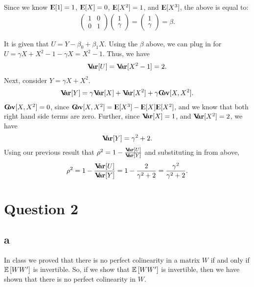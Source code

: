 \documentclass[12pt]{paper}
\newcommand{\E}{{\rm I\kern-.3em E}}
\newcommand{\Var}{{\rm \textbf{V\kern-.3em ar}}}
\newcommand{\Cov}{{\rm \textbf{C\kern-.3em ov}}}
\begin{document}
Since we know $\E[1]=1$, $\E[X]=0$, $\E[X^2]=1$, and $\E[X^3]$, the above is equal to:
\begin{align*}
\begin{pmatrix}
1 & 0\\
0 & 1
\end{pmatrix}
\begin{pmatrix}
1\\
\gamma
\end{pmatrix}
=
\begin{pmatrix}
1\\
\gamma
\end{pmatrix}=\beta.
\end{align*}

It is given that $U=Y-\beta_0+\beta_1X$. Using the $\beta$ above, we can plug in for $U=\gamma X+X^2-1-\gamma X= X^2-1$. Thus, we have
\begin{align*}
\Var[U]=\Var[X^2-1]=2.
\end{align*}
Next, consider $Y=\gamma X+X^2$.
\begin{align*}
\Var[Y]=\gamma \Var[X]+\Var[X^2]+\gamma \Cov[X,X^2].
\end{align*}
$\Cov[X,X^2]=0$, since $\Cov[X,X^2]=\E[X^3]-\E[X]\E[X^2]$, and we know that both right hand side terms are zero. Further, since $\Var[X]=1$, and $\Var[X^2]=2$, we have
\begin{align*}
\Var[Y]=\gamma^2+2.
\end{align*}
Using our previous result that $\rho^2=1-\frac{\Var[U]}{\Var[Y]}$ and substituting in from above,
\begin{align*}
\rho^2=1-\frac{\Var[U]}{\Var[Y]}=1-\frac{2}{\gamma^2+2}=\frac{\gamma^2}{\gamma^2 +2}.
\end{align*}



\section*{Question 2}

\subsection*{a}

In class we proved that there is no perfect colinearity in a matrix $W$ if and only if $\mathbb{E} \left [ WW' \right ]$ is invertible. So, if we show that $\mathbb{E} \left [ WW' \right ]$ is invertible, then we have shown that there is no perfect colinearity in $W$.
\end{document}
